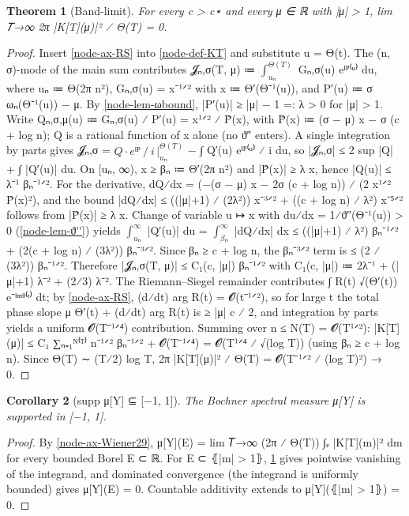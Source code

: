 \documentclass[11pt]{article}
\newtheorem{theorem}{Theorem}
\newtheorem{corollary}[theorem]{Corollary}
\theoremstyle{definition}
\begin{document}
\begin{theorem}[{Band-limit}]\label{node-thm-bandlim}
For every c > c⋆ and every μ ∈ ℝ with |μ| > 1,   lim 𝑇→∞ 2π |K[T](μ)|² ⁄ Θ(T) = 0.
\end{theorem}
\begin{proof}
Insert \ref{node-ax-RS} into \ref{node-def-KT} and substitute u = Θ(t). The (n, σ)-mode of the main sum contributes 𝓙ₙ,σ(T, μ) ≔ \(\int_{uₙ}^{Θ(T)}\) Gₙ,σ(u) eⁱᴾ⁽ᵘ⁾ du, where uₙ ≔ Θ(2π n²), Gₙ,σ(u) = x⁻¹ᐟ² with x ≔ Θ′(Θ⁻¹(u)), and P′(u) ≔ σ ωₙ(Θ⁻¹(u)) − μ. By \ref{node-lem-ωbound}, |P′(u)| ≥ |μ| − 1 =: λ > 0 for |μ| > 1. Write Qₙ,σ,μ(u) ≔ Gₙ,σ(u) ⁄ P′(u) = x¹ᐟ² ⁄ P̂(x), with P̂(x) ≔ (σ − μ) x − σ (c + log n); Q is a rational function of x alone (no ϑ″ enters). A single integration by parts gives 𝓙ₙ,σ = \(Q · eⁱᴾ ⁄ i\,\big|_{uₙ}^{Θ(T)}\) − ∫ Q′(u) eⁱᴾ⁽ᵘ⁾ ⁄ i du, so |𝓙ₙ,σ| ≤ 2 sup |Q| + ∫ |Q′(u)| du. On [uₙ, ∞), x ≥ βₙ ≔ Θ′(2π n²) and |P̂(x)| ≥ λ x, hence |Q(u)| ≤ λ⁻¹ βₙ⁻¹ᐟ². For the derivative, dQ⁄dx = (−(σ − μ) x − 2σ (c + log n)) ⁄ (2 x¹ᐟ² P̂(x)²), and the bound |dQ⁄dx| ≤ ((|μ|+1) ⁄ (2λ²)) x⁻³ᐟ² + ((c + log n) ⁄ λ²) x⁻⁵ᐟ² follows from |P̂(x)| ≥ λ x. Change of variable u ↦ x with du⁄dx = 1⁄ϑ″(Θ⁻¹(u)) > 0 (\ref{node-lem-ϑ''}) yields \(\int_{uₙ}^{∞}\) |Q′(u)| du = \(\int_{βₙ}^{∞}\) |dQ⁄dx| dx ≤ ((|μ|+1) ⁄ λ²) βₙ⁻¹ᐟ² + (2(c + log n) ⁄ (3λ²)) βₙ⁻³ᐟ². Since βₙ ≥ c + log n, the βₙ⁻³ᐟ² term is ≤ (2 ⁄ (3λ²)) βₙ⁻¹ᐟ². Therefore |𝓙ₙ,σ(T, μ)| ≤ C₁(c, |μ|) βₙ⁻¹ᐟ² with C₁(c, |μ|) ≔ 2λ⁻¹ + (|μ|+1) λ⁻² + (2⁄3) λ⁻². The Riemann–Siegel remainder contributes ∫ R(t) √(Θ′(t)) e⁻ⁱᵐᶿ⁽ᵗ⁾ dt; by \ref{node-ax-RS}, (d⁄dt) arg R(t) = 𝓞(t⁻¹ᐟ²), so for large t the total phase slope μ Θ′(t) + (d⁄dt) arg R(t) is ≥ |μ| c ⁄ 2, and integration by parts yields a uniform 𝓞(T⁻¹ᐟ⁴) contribution. Summing over n ≤ N(T) = 𝓞(T¹ᐟ²): |K[T](μ)| ≤ C₁ ∑ₙ₌₁ᴺ⁽ᵀ⁾ n⁻¹ᐟ² βₙ⁻¹ᐟ² + 𝓞(T⁻¹ᐟ⁴) = 𝓞(T¹ᐟ⁴ ⁄ √(log T)) (using βₙ ≥ c + log n). Since Θ(T) ∼ (T⁄2) log T, 2π |K[T](μ)|² ⁄ Θ(T) = 𝓞(T⁻¹ᐟ² ⁄ (log T)²) → 0.
\end{proof}

\begin{corollary}[{supp μ[Y] ⊆ [−1, 1]}]\label{node-cor-supp}
The Bochner spectral measure μ[Y] is supported in [−1, 1].
\end{corollary}
\begin{proof}
By \ref{node-ax-Wiener29}, μ[Y](E) = lim 𝑇→∞ (2π ⁄ Θ(T)) ∫ₑ |K[T](m)|² dm for every bounded Borel E ⊂ ℝ. For E ⊂ ⦃|m| > 1⦄, \ref{node-thm-bandlim} gives pointwise vanishing of the integrand, and dominated convergence (the integrand is uniformly bounded) gives μ[Y](E) = 0. Countable additivity extends to μ[Y](⦃|m| > 1⦄) = 0.
\end{proof}
\end{document}
